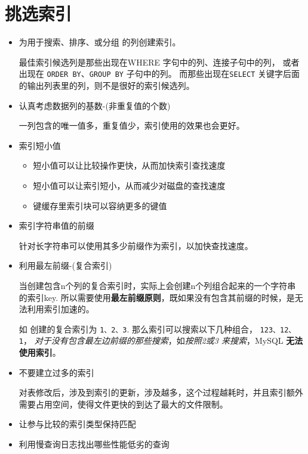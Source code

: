 \documentclass[UTF8,a4paper,12pt]{ctexbook}
\begin{document}
	
	
	\section{挑选索引}
		\begin{itemize}
			\item 为用于搜索、排序、或分组 的列创建索引。
			
				最佳索引候选列是那些出现在WHERE 字句中的列、连接子句中的列， 或者出现在 \verb|ORDER BY|、\verb|GROUP BY| 子句中的列。
				而那些出现在\verb|SELECT| 关键字后面的输出列表里的列，则不是很好的索引候选列。
				
			\item 认真考虑数据列的基数-(非重复值的个数)
				
				一列包含的唯一值多，重复值少，索引使用的效果也会更好。
			
			\item 索引短小值
				
				\begin{itemize}
					\item 短小值可以让比较操作更快，从而加快索引查找速度
					\item 短小值可以让索引短小，从而减少对磁盘的查找速度
					\item 键缓存里索引块可以容纳更多的键值
				\end{itemize}
				
				
			\item 索引字符串值的前缀
			
				针对长字符串可以使用其多少前缀作为索引，以加快查找速度。
			
			
			\item 利用最左前缀-(复合索引)
				
				当创建包含n个列的复合索引时，实际上会创建n个列组合起来的一个字符串 的索引key. 所以需要使用\textbf{最左前缀原则}，既如果没有包含其前缀的时候，是无法利用索引加速的。
				
				如 创建的复合索引为 \verb|1、2、3|.
				那么索引可以搜索以下几种组合， \verb|123、12、1|， \textit{对于没有包含最左边前缀的那些搜索}，如\textit{按照2或3 来搜索}，MySQL \textbf{无法使用索引}。
			
			\item 不要建立过多的索引
			
				对表修改后，涉及到索引的更新，涉及越多，这个过程越耗时，并且索引额外需要占用空间，使得文件更快的到达了最大的文件限制。
			
			\item 让参与比较的索引类型保持匹配
			
			\item 利用慢查询日志找出哪些性能低劣的查询
		\end{itemize}
	
\end{document}
